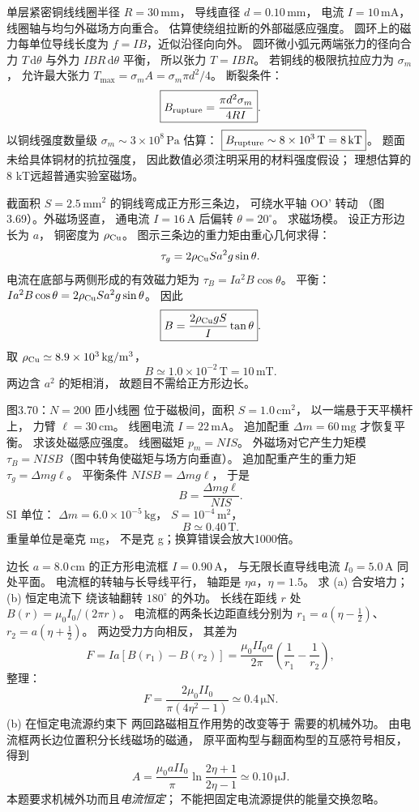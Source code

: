 单层紧密铜线线圈半径 $R=30\,\mathrm{mm}$，
导线直径 $d=0.10\,\mathrm{mm}$，
电流 $I=10\,\mathrm{mA}$，
线圈轴与均匀外磁场方向重合。
估算使绕组拉断的外部磁感应强度。
\exsolution
圆环上的磁力每单位导线长度为
$f=IB$，近似沿径向向外。
圆环微小弧元两端张力的径向合力
$T\,\mathrm d\theta$
与外力
$IBR\,\mathrm d\theta$ 平衡，
所以张力 $T=IBR$。
若铜线的极限抗拉应力为 $\sigma_m$，
允许最大张力
$T_{\max}=\sigma_m A=
\sigma_m\pi d^2/4$。
断裂条件：
\[
\boxed{B_{\rm rupture}=
\frac{\pi d^2\sigma_m}{4RI}}.
\]
以铜线强度数量级
$\sigma_m\sim3\times10^8\,\mathrm{Pa}$
估算：
$\boxed{B_{\rm rupture}\sim8\times10^3\,\mathrm T
=8\,\mathrm{kT}}$。
\excheck 题面未给具体铜材的抗拉强度，
因此数值必须注明采用的材料强度假设；
理想估算的8 kT远超普通实验室磁场。

截面积 $S=2.5\,\mathrm{mm^2}$
的铜线弯成正方形三条边，
可绕水平轴 OO' 转动
（图3.69）。外磁场竖直，
通电流 $I=16\,\mathrm A$ 后偏转
$\theta=20^\circ$。
求磁场模。
\exsolution
设正方形边长为 $a$，
铜密度为 $\rho_{\rm Cu}$。
图示三条边的重力矩由重心几何求得：
\[
\tau_g=2\rho_{\rm Cu}Sa^2g\sin\theta.
\]
电流在底部与两侧形成的有效磁力矩为
$\tau_B=Ia^2B\cos\theta$。
平衡：
$Ia^2B\cos\theta
=2\rho_{\rm Cu}Sa^2g\sin\theta$。
因此
\[
\boxed{B=\frac{2\rho_{\rm Cu}gS}{I}\tan\theta}.
\]
取 $\rho_{\rm Cu}\simeq8.9\times10^3
\,\mathrm{kg/m^3}$，
\[
\boxed{B\simeq1.0\times10^{-2}\,\mathrm T
=10\,\mathrm{mT}}.
\]
\excheck 两边含 $a^2$ 的矩相消，
故题目不需给正方形边长。

图3.70：$N=200$ 匝小线圈
位于磁极间，面积
$S=1.0\,\mathrm{cm^2}$，
以一端悬于天平横杆上，
力臂 $\ell=30\,\mathrm{cm}$。
线圈电流
$I=22\,\mathrm{mA}$。
追加配重
$\Delta m=60\,\mathrm{mg}$
才恢复平衡。
求该处磁感应强度。
\exsolution
线圈磁矩
$p_m=NIS$。
外磁场对它产生力矩模
$\tau_B=NISB$（图中转角使磁矩与场方向垂直）。
追加配重产生的重力矩
$\tau_g=\Delta mg\ell$。
平衡条件
$NISB=\Delta mg\ell$，
于是
\[
\boxed{B=\frac{\Delta mg\ell}{NIS}}.
\]
SI 单位：
$\Delta m=6.0\times10^{-5}\,\mathrm{kg}$，
$S=10^{-4}\,\mathrm{m^2}$，
\[
\boxed{B\simeq0.40\,\mathrm T}.
\]
\excheck 重量单位是毫克 mg，
不是克 g；换算错误会放大1000倍。

边长 $a=8.0\,\mathrm{cm}$ 的正方形电流框
$I=0.90\,\mathrm A$，
与无限长直导线电流
$I_0=5.0\,\mathrm A$ 同处平面。
电流框的转轴与长导线平行，
轴距是 $\eta a$，$\eta=1.5$。
求 (a) 合安培力；(b) 恒定电流下
绕该轴翻转 $180^\circ$ 的外功。
\exsolution
长线在距线 $r$ 处
$B(r)=\mu_0I_0/(2\pi r)$。
电流框的两条长边距直线分别为
$r_1=a(\eta-\tfrac12)$、
$r_2=a(\eta+\tfrac12)$。
两边受力方向相反，
其差为
\[
F=Ia[B(r_1)-B(r_2)]
=\frac{\mu_0II_0a}{2\pi}
\left(\frac1{r_1}-\frac1{r_2}\right),
\]
整理：
\[
\boxed{F=\frac{2\mu_0II_0}{\pi(4\eta^2-1)}
\simeq0.4\,\mathrm{\mu N}}.
\]
(b) 在恒定电流源约束下
两回路磁相互作用势的改变等于
需要的机械外功。
由电流框两长边位置积分长线磁场的磁通，
原平面构型与翻面构型的互感符号相反，
得到
\[
\boxed{A=\frac{\mu_0aII_0}{\pi}
\ln\frac{2\eta+1}{2\eta-1}
\simeq0.10\,\mathrm{\mu J}}.
\]
\excheck 本题要求机械外功而且\emph{电流恒定}；
不能把固定电流源提供的能量交换忽略。

